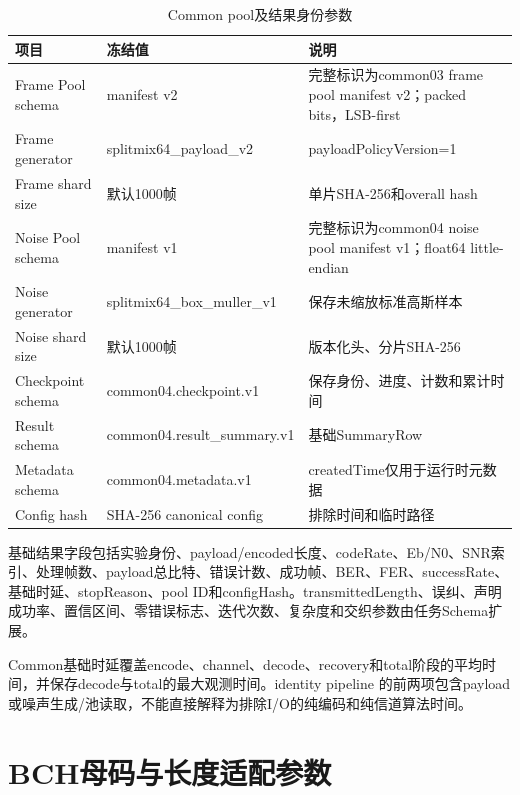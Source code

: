 \begin{table}[htbp]
  \centering
  \scriptsize
  \caption{Common pool及结果身份参数}
  \label{tab:app-common-pool-schema}
  \begin{tabular}{p{}p{}p{}}
    \toprule
    项目 & 冻结值 & 说明 \\
    \midrule
    Frame Pool schema & manifest v2 & 完整标识为common03 frame pool manifest v2；packed bits，LSB-first \\
    Frame generator & splitmix64\_payload\_v2 & payloadPolicyVersion=1 \\
    Frame shard size & 默认1000帧 & 单片SHA-256和overall hash \\
    Noise Pool schema & manifest v1 & 完整标识为common04 noise pool manifest v1；float64 little-endian \\
    Noise generator & splitmix64\_box\_muller\_v1 & 保存未缩放标准高斯样本 \\
    Noise shard size & 默认1000帧 & 版本化头、分片SHA-256 \\
    Checkpoint schema & common04.checkpoint.v1 & 保存身份、进度、计数和累计时间 \\
    Result schema & common04.result\_summary.v1 & 基础SummaryRow \\
    Metadata schema & common04.metadata.v1 & createdTime仅用于运行时元数据 \\
    Config hash & SHA-256 canonical config & 排除时间和临时路径 \\
    \bottomrule
  \end{tabular}
\end{table}

基础结果字段包括实验身份、payload/encoded长度、codeRate、Eb/N0、SNR索引、处理帧数、payload总比特、错误计数、成功帧、BER、FER、successRate、基础时延、stopReason、pool ID和configHash。transmittedLength、误纠、声明成功率、置信区间、零错误标志、迭代次数、复杂度和交织参数由任务Schema扩展。

Common基础时延覆盖encode、channel、decode、recovery和total阶段的平均时间，并保存decode与total的最大观测时间。identity pipeline 的前两项包含payload或噪声生成/池读取，不能直接解释为排除I/O的纯编码和纯信道算法时间。

\section{BCH母码与长度适配参数}

